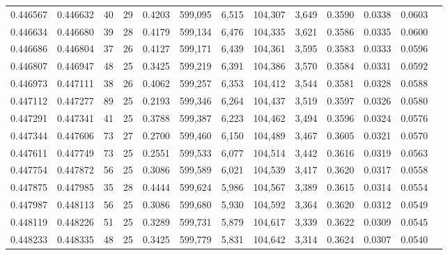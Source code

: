 \begin{tabular}{rrrrrrrrrrrrr}
0.446567 & 0.446632 &    40 &  29 &                                     0.4203 & 599,095 &   6,515 & 104,307 &   3,649 & 0.3590 & 0.0338 & 0.0603 \\
0.446634 & 0.446680 &    39 &  28 &                                     0.4179 & 599,134 &   6,476 & 104,335 &   3,621 & 0.3586 & 0.0335 & 0.0600 \\
0.446686 & 0.446804 &    37 &  26 &                                     0.4127 & 599,171 &   6,439 & 104,361 &   3,595 & 0.3583 & 0.0333 & 0.0596 \\
0.446807 & 0.446947 &    48 &  25 &                                     0.3425 & 599,219 &   6,391 & 104,386 &   3,570 & 0.3584 & 0.0331 & 0.0592 \\
0.446973 & 0.447111 &    38 &  26 &                                     0.4062 & 599,257 &   6,353 & 104,412 &   3,544 & 0.3581 & 0.0328 & 0.0588 \\
0.447112 & 0.447277 &    89 &  25 &                                     0.2193 & 599,346 &   6,264 & 104,437 &   3,519 & 0.3597 & 0.0326 & 0.0580 \\
0.447291 & 0.447341 &    41 &  25 &                                     0.3788 & 599,387 &   6,223 & 104,462 &   3,494 & 0.3596 & 0.0324 & 0.0576 \\
0.447344 & 0.447606 &    73 &  27 &                                     0.2700 & 599,460 &   6,150 & 104,489 &   3,467 & 0.3605 & 0.0321 & 0.0570 \\
0.447611 & 0.447749 &    73 &  25 &                                     0.2551 & 599,533 &   6,077 & 104,514 &   3,442 & 0.3616 & 0.0319 & 0.0563 \\
0.447754 & 0.447872 &    56 &  25 &                                     0.3086 & 599,589 &   6,021 & 104,539 &   3,417 & 0.3620 & 0.0317 & 0.0558 \\
0.447875 & 0.447985 &    35 &  28 &                                     0.4444 & 599,624 &   5,986 & 104,567 &   3,389 & 0.3615 & 0.0314 & 0.0554 \\
0.447987 & 0.448113 &    56 &  25 &                                     0.3086 & 599,680 &   5,930 & 104,592 &   3,364 & 0.3620 & 0.0312 & 0.0549 \\
0.448119 & 0.448226 &    51 &  25 &                                     0.3289 & 599,731 &   5,879 & 104,617 &   3,339 & 0.3622 & 0.0309 & 0.0545 \\
0.448233 & 0.448335 &    48 &  25 &                                     0.3425 & 599,779 &   5,831 & 104,642 &   3,314 & 0.3624 & 0.0307 & 0.0540 \\

\end{tabular}
